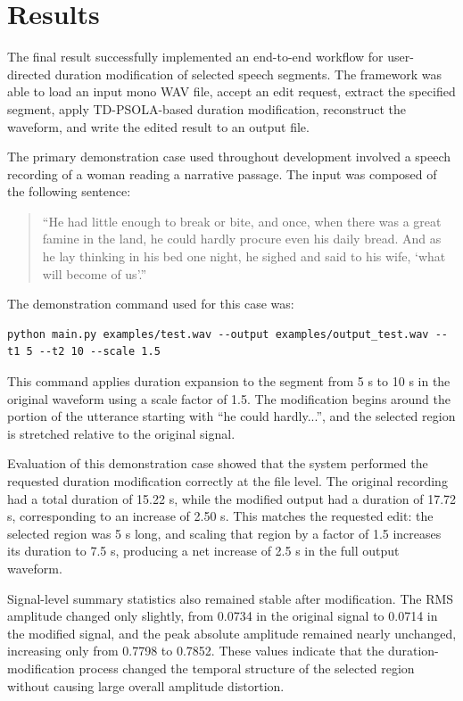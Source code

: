 \documentclass{article}
\begin{document}
\section{Results}

The final result successfully implemented an end-to-end workflow for user-directed duration modification of selected speech segments. The framework was able to load an input mono WAV file, accept an edit request, extract the specified segment, apply TD-PSOLA-based duration modification, reconstruct the waveform, and write the edited result to an output file.

The primary demonstration case used throughout development involved a speech recording of a woman reading a narrative passage. The input was composed of the following sentence: 

\begin{quote}
“He had little enough to break or bite, and once, when there was a great famine in the land, he could hardly procure even his daily bread. And as he lay thinking in his bed one night, he sighed and said to his wife, ‘what will become of us’.”
\end{quote}

The demonstration command used for this case was:

\begin{verbatim}
python main.py examples/test.wav --output examples/output_test.wav --t1 5 --t2 10 --scale 1.5
\end{verbatim}

This command applies duration expansion to the segment from 5 s to 10 s in the original waveform using a scale factor of 1.5. The modification begins around the portion of the utterance starting with “he could hardly...”, and the selected region is stretched relative to the original signal.

Evaluation of this demonstration case showed that the system performed the requested duration modification correctly at the file level. The original recording had a total duration of 15.22 s, while the modified output had a duration of 17.72 s, corresponding to an increase of 2.50 s. This matches the requested edit: the selected region was 5 s long, and scaling that region by a factor of 1.5 increases its duration to 7.5 s, producing a net increase of 2.5 s in the full output waveform.

Signal-level summary statistics also remained stable after modification. The RMS amplitude changed only slightly, from 0.0734 in the original signal to 0.0714 in the modified signal, and the peak absolute amplitude remained nearly unchanged, increasing only from 0.7798 to 0.7852. These values indicate that the duration-modification process changed the temporal structure of the selected region without causing large overall amplitude distortion.
\end{document}
